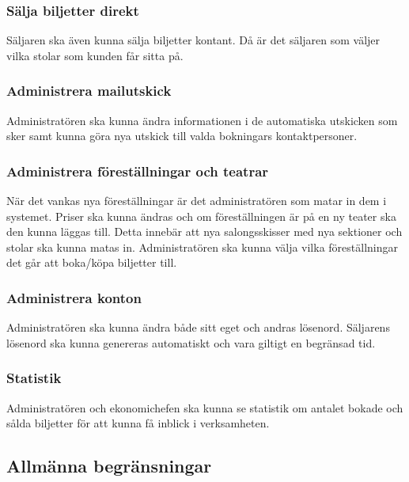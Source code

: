 \documentclass[a4paper, twoside, 11pt, titlepage]{article}
\begin{document}
		\subsubsection{Sälja biljetter direkt}


		Säljaren ska även kunna sälja biljetter kontant. Då är det säljaren som väljer vilka stolar som kunden får sitta på.

		\subsubsection{Administrera mailutskick}


		Administratören ska kunna ändra informationen i de automatiska utskicken som sker samt kunna göra nya utskick till valda bokningars kontaktpersoner.

		\subsubsection{Administrera föreställningar och teatrar}


		När det vankas nya föreställningar är det administratören som matar in dem i systemet. Priser ska kunna ändras och om föreställningen är på en ny teater ska den kunna läggas till. Detta innebär att nya salongsskisser med nya sektioner och stolar ska kunna matas in. Administratören ska kunna välja vilka föreställningar det går att boka/köpa biljetter till.

		\subsubsection{Administrera konton}


		Administratören ska kunna ändra både sitt eget och andras lösenord. Säljarens lösenord ska kunna genereras automatiskt och vara giltigt en begränsad tid.

		\subsubsection{Statistik}


		Administratören och ekonomichefen ska kunna se statistik om antalet bokade och sålda biljetter för att kunna få inblick i verksamheten.

	\subsection{Allmänna begränsningar}
\end{document}
